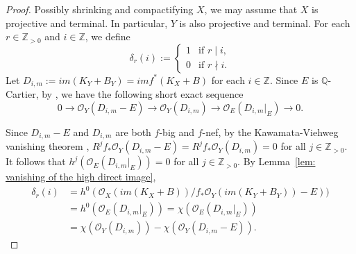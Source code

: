 \documentclass[11pt]{amsart}
\numberwithin{equation}{section}
\newcommand{\Qq}{\mathbb{Q}}
\newcommand{\Zz}{\mathbb{Z}}
\theoremstyle{definition}
\theoremstyle{definition}
\begin{document}
\begin{proof}
Possibly shrinking and compactifying $X$, we may assume that $X$ is projective and terminal. In particular, $Y$ is also projective and terminal. For each $r\in \Zz_{>0}$ and $i\in \Zz$, we define $$\delta_r(i):=\begin{cases}1 & \text{if } r\mid i,\\
0 & \text{if } r\nmid i.
\end{cases}$$ Let $D_{i,m}:=im(K_Y+B_Y)=imf^*(K_X+B)$ for each $i\in \Zz$. Since $E$ is $\Qq$-Cartier, by \cite[Proposition 5.26]{KM98}, we have the following short exact sequence
$$0\to\mathcal{O}_Y(D_{i,m}-E) \to\mathcal{O}_Y(D_{i,m})\to\mathcal{O}_E(D_{i,m}|_E) \to 0.$$

Since $D_{i,m}-E$ and $D_{i,m}$ are both $f$-big and $f$-nef, by the Kawamata-Viehweg vanishing theorem \cite[Theorem~1.2.5]{KMM87}, $R^jf_*\mathcal{O}_Y(D_{i,m}-E)=R^jf_*\mathcal{O}_Y(D_{i,m})=0$ for all $j\in\Zz_{>0}$. It follows that $h^j(\mathcal{O}_E(D_{i,m}|_E))=0$ for all $j\in\Zz_{>0}$. By Lemma~\ref{lem: vanishing of the high direct image}, 
\begin{align*}
    \delta_r(i)&=h^0(\mathcal{O}_X(im(K_X+B))/f_*\mathcal{O}_Y(im(K_Y+B_Y))-E))\\
    &=h^0(\mathcal{O}_E(D_{i,m}|_E))=\chi(\mathcal{O}_E(D_{i,m}|_E))\\
    &=\chi(\mathcal{O}_Y(D_{i,m}))-\chi(\mathcal{O}_Y(D_{i,m}-E)).
\end{align*}
 


\end{proof}
\end{document}
